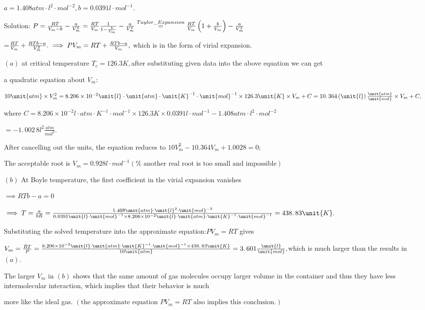 \documentclass{ctexart}
\begin{document}
$a=1.408\unit{atm}\cdot \unit{l}^{2}\cdot \unit{mol}^{-2},b=0.0391\unit{l}%
\cdot \unit{mol}^{-1}.$

Solution: $P=\frac{RT}{V_{m}-b}-\frac{a}{V_{m}^{2}}=\frac{RT}{V_{m}}\frac{1}{%
1-\frac{b}{V_{m}}}-\frac{a}{V_{m}^{2}}\overset{Taylor\_Expansion}{=}\frac{RT%
}{V_{m}}\left( 1+\frac{b}{V_{m}}\right) -\frac{a}{V_{m}^{2}}$

=$\frac{RT}{V_{m}}+\frac{RTb-a}{V_{m}^{2}}.\implies PV_{m}=RT+\frac{RTb-a}{%
V_{m}},$ which is in the form of virial expansion.

$\left( a\right) $ at critical temperature $T_{c}=126.3\unit{K},$after
substituting given data into the above equation we can get

a quadratic equation about $V_{m}:$

$10\unit{atm}\times V_{m}^{2}=8.206\times 10^{-2}\unit{l}\cdot \unit{atm}%
\cdot \unit{K}^{-1}\cdot \unit{mol}^{-1}\times 126.3\unit{K}\times
V_{m}+C=\allowbreak 10.\,\allowbreak 364\left( \unit{l}\right) \frac{\unit{%
atm}}{\unit{mol}}\times V_{m}+C,$

where $C=8.206\times 10^{-2}\unit{l}\cdot \unit{atm}\cdot \unit{K}^{-1}\cdot 
\unit{mol}^{-1}\times 126.3\unit{K}\times 0.0391\unit{l}\cdot \unit{mol}%
^{-1}-1.408\unit{atm}\cdot \unit{l}^{2}\cdot \unit{mol}^{-2}$

$=-1.\,\allowbreak 002\,8\unit{l}^{2}\frac{\unit{atm}}{\unit{mol}^{2}}.$

After cancelling out the units, the equation reduces to $%
10V_{m}^{2}-10.364V_{m}+1.0028=0;$

The acceptable root is $V_{m}=0.928\unit{l}\cdot \unit{mol}^{-1}\left( \text{%
another real root is too small and impossible}\right) $

$\left( b\right) $ At Boyle temperature, the first coefficient in the virial
expansion vanishes

$\implies RTb-a=0$

$\implies T=\frac{a}{bR}=\frac{1.408\unit{atm}\cdot \unit{l}^{2}\cdot \unit{%
mol}^{-2}}{0.0391\unit{l}\cdot \unit{mol}^{-1}\times 8.206\times 10^{-2}%
\unit{l}\cdot \unit{atm}\cdot \unit{K}^{-1}\cdot \unit{mol}^{-1}}%
=\allowbreak 438.\,\allowbreak 83\unit{K}.$

Substituting the solved temperature into the approximate equation:$PV_{m}=RT$
gives

$V_{m}=\frac{RT}{P}=\frac{8.206\times 10^{-2}\unit{l}\cdot \unit{atm}\cdot 
\unit{K}^{-1}\cdot \unit{mol}^{-1}\times \allowbreak 438.\,\allowbreak 83%
\unit{K}}{10\unit{atm}}=\allowbreak 3.\,\allowbreak 601\frac{\unit{l}}{\unit{%
mol}},$which is much larger than the results in $\left( a\right) .$

The larger $V_{m}$ in $\left( b\right) $ shows that the same amount of gas
molecules occupy larger volume in the container and thus they have less
intermolecular interaction, which implies that their behavior is much

more like the ideal gas. $\left( \text{the approximate equation }PV_{m}=RT%
\text{ also implies this conclusion.}\right) $
\end{document}
